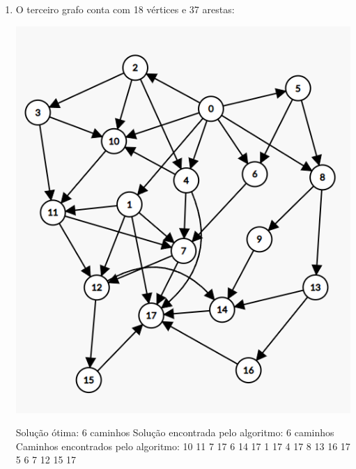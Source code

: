 \begin{enumerate}
    
    \item O terceiro grafo conta com 18 vértices e 37 arestas:
    \begin{center}
        \includegraphics[scale=0.4]{figuras/Grafo3.png}
    \end{center}
    Solução ótima: 6 caminhos\newline
    Solução encontrada pelo algoritmo: 6 caminhos\newline
    Caminhos encontrados pelo algoritmo: 10 11 7 17  6 14 17  1 17  4 17  8 13 16 17  5 6 7 12 15 17 \newline
    

\end{enumerate}
